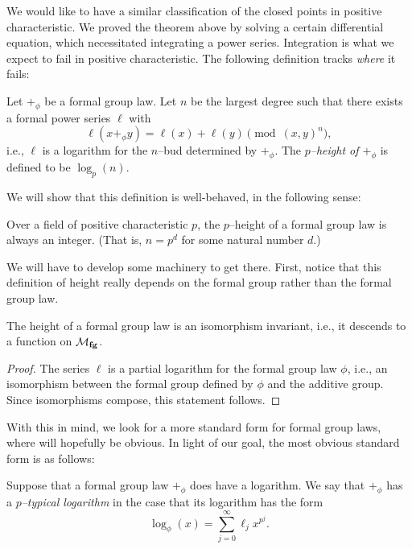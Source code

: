 We would like to have a similar classification of the closed points in positive characteristic.  We proved the theorem above by solving a certain differential equation, which necessitated integrating a power series.  Integration is what we expect to fail in positive characteristic.  The following definition tracks \emph{where} it fails:
\begin{definition}
Let $+_\phi$ be a formal group law.  Let $n$ be the largest degree such that there exists a formal power series $\ell$ with \[\ell(x +_\phi y) = \ell(x) + \ell(y) \pmod{(x, y)^{n}},\]  i.e., $\ell$ is a logarithm for the $n$--bud determined by $+_\phi$.  The \textit{$p$--height of $+_\phi$} is defined to be $\log_p(n)$.
\end{definition}

We will show that this definition is well-behaved, in the following sense:
\begin{lemma}\label{FGLHeightIsAnInteger}
Over a field of positive characteristic $p$, the $p$--height of a formal group law is always an integer.  (That is, $n = p^d$ for some natural number $d$.)
\end{lemma}
\noindent We will have to develop some machinery to get there.  First, notice that this definition of height really depends on the formal group rather than the formal group law.

\begin{lemma}
The height of a formal group law is an isomorphism invariant, i.e., it descends to a function on $\mathcal{M}_{\mathbf{fg}}$.
\end{lemma}
\begin{proof}
The series $\ell$ is a partial logarithm for the formal group law $\phi$, i.e., an isomorphism between the formal group defined by $\phi$ and the additive group.  Since isomorphisms compose, this statement follows.
\end{proof}

With this in mind, we look for a more standard form for formal group laws, where  will hopefully be obvious.  In light of our goal, the most obvious standard form is as follows:
\begin{definition}\label{DefnpTypicalLog}
Suppose that a formal group law $+_\phi$ does have a logarithm.  We say that $+_\phi$ has a \textit{$p$--typical logarithm} in the case that its logarithm has the form \[\log_\phi(x) = \sum_{j=0}^\infty \ell_j x^{p^j}.\]
\end{definition}

